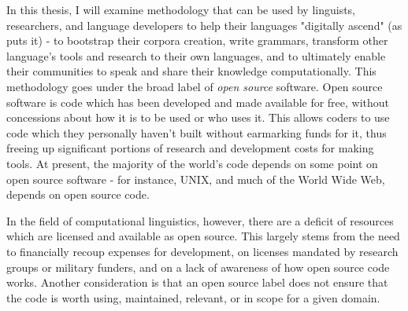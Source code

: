 In this thesis, I will examine methodology that can be used by linguists, researchers, and language developers to help their languages "digitally ascend" (as \citet{kornai2013digital} puts it) - to bootstrap their corpora creation, write grammars, transform other language's tools and research to their own languages, and to ultimately enable their communities to speak and share their knowledge computationally. This methodology goes under the broad label of \textit{open source} software. Open source software is code which has been developed and made available for free, without concessions about how it is to be used or who uses it. This allows coders to use code which they personally haven't built without earmarking funds for it, thus freeing up significant portions of research and development costs for making tools. At present, the majority of the world's code depends on some point on open source software - for instance, UNIX, and much of the World Wide Web, depends on open source code.

In the field of computational linguistics, however, there are a deficit of resources which are licensed and available as open source. This largely stems from the need to financially recoup expenses for development, on licenses mandated by research groups or military funders, and on a lack of awareness of how open source code works. Another consideration is that an open source label does not ensure that the code is worth using, maintained, relevant, or in scope for a given domain.



